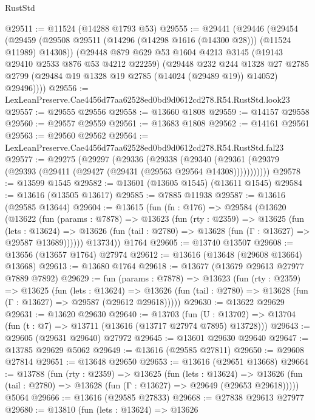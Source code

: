 \begin{lexlean}{RustStd}
\begin{coremodule}
@29511 := @11524 (@14288 @1793 @53)
@29555 := @29441
    (@29446
      (@29454
        (@29459 (@29508 @29511 (@14296 (@14298 @1616 (@14300 @28))) (@11524 @11989) @14308))
        (@29448
          @879
          @629
          @53
          @1604
          @4213
          @3145
          (@19143 @29410 @2533 @876 @53 @4212 @22259)
          (@29448
            @232
            @244
            @1328
            @27
            @2785
            @2799
            (@29484 @19 @1328 @19 @2785 (@14024 (@29489 @19)) @14052)
            @29496))))
@29556 := LexLeanPreserve.Cae4456d77aa62528ed0bd9d0612cd278.R54.RustStd.look23
@29557 := @29555 @29556
@29558 := @13660 @1808
@29559 := @14157 @29558
@29560 := @29557 @29559
@29561 := @13683 @1808
@29562 := @14161 @29561
@29563 := @29560 @29562
@29564 := LexLeanPreserve.Cae4456d77aa62528ed0bd9d0612cd278.R54.RustStd.fal23
@29577 := @29275
    (@29297
      (@29336
        (@29338
          (@29340 (@29361 (@29379 (@29393 (@29411 (@29427 (@29431 (@29563 @29564 @14308)))))))))))
@29578 := @13599 @1545
@29582 := @13601 (@13605 @1545) (@13611 @1545)
@29584 := @13616 (@13505 @13617)
@29585 := @7885 @11938
@29587 := @13616 (@29585 @13644)
@29604 := @13615
    (fun (fn : @176) =>
    @29584
      (@13620
        (@13622
          (fun (params : @7878) =>
          @13623
            (fun (rty : @2359) =>
            @13625
              (fun (lets : @13624) =>
              @13626 (fun (tail : @2780) => @13628 (fun (Γ : @13627) => @29587 @13689))))))
        @13734))
    @1764
@29605 := @13740 @13507
@29608 := @13656 (@13657 @1764) @27974
@29612 := @13616 (@13648 (@29608 @13664) @13668)
@29613 := @13680 @1764
@29618 := @13677 (@13679 @29613 @27977 @7889 @7892)
@29629 := fun (params : @7878) =>
  @13623
    (fun (rty : @2359) =>
    @13625
      (fun (lets : @13624) =>
      @13626 (fun (tail : @2780) => @13628 (fun (Γ : @13627) => @29587 (@29612 @29618)))))
@29630 := @13622 @29629
@29631 := @13620 @29630
@29640 := @13703
    (fun (U : @13702) => @13704 (fun (t : @7) => @13711 (@13616 (@13717 @27974 @7895) @13728)))
@29643 := @29605 (@29631 @29640) @27972
@29645 := @13601 @29630 @29640
@29647 := @13785 @29629 @5062
@29649 := @13616 (@29585 @27811)
@29650 := @29608 @27814
@29651 := @13648 @29650
@29653 := @13616 (@29651 @13668)
@29664 := @13788
    (fun (rty : @2359) =>
    @13625
      (fun (lets : @13624) =>
      @13626 (fun (tail : @2780) => @13628 (fun (Γ : @13627) => @29649 (@29653 @29618)))))
    @5064
@29666 := @13616 (@29585 @27833)
@29668 := @27838 @29613 @27977
@29680 := @13810
    (fun (lets : @13624) =>
    @13626

\end{coremodule}
\end{lexlean}
